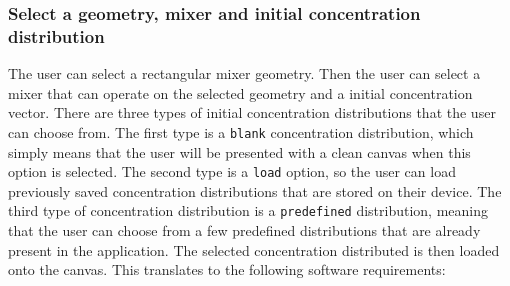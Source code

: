 \subsubsection{Select a geometry, mixer and initial concentration distribution}
The user can select a rectangular mixer geometry. Then the user can select a mixer that can operate on the selected geometry and a initial concentration vector. There are three types of initial concentration distributions that the user can choose from. The first type is a \texttt{blank} concentration distribution, which simply means that the user will be presented with a clean canvas when this option is selected. The second type is a \texttt{load} option, so the user can load previously saved concentration distributions that are stored on their device. The third type of 
concentration distribution is a \texttt{predefined} distribution, meaning that the user can choose from a few predefined distributions that are already present in the application. The selected concentration distributed is then loaded onto the canvas. This translates to the following software requirements:

